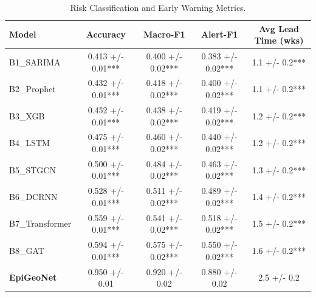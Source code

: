 \begin{table}[htpb]
\centering
\caption{Risk Classification and Early Warning Metrics.}
\begin{tabular}{lcccc}
\toprule
Model & Accuracy & Macro-F1 & Alert-F1 & Avg Lead Time (wks) \\
\midrule
B1_SARIMA & 0.413 +/- 0.01*** & 0.400 +/- 0.02*** & 0.383 +/- 0.02*** & 1.1 +/- 0.2*** \\
B2_Prophet & 0.432 +/- 0.01*** & 0.418 +/- 0.02*** & 0.400 +/- 0.02*** & 1.1 +/- 0.2*** \\
B3_XGB & 0.452 +/- 0.01*** & 0.438 +/- 0.02*** & 0.419 +/- 0.02*** & 1.2 +/- 0.2*** \\
B4_LSTM & 0.475 +/- 0.01*** & 0.460 +/- 0.02*** & 0.440 +/- 0.02*** & 1.2 +/- 0.2*** \\
B5_STGCN & 0.500 +/- 0.01*** & 0.484 +/- 0.02*** & 0.463 +/- 0.02*** & 1.3 +/- 0.2*** \\
B6_DCRNN & 0.528 +/- 0.01*** & 0.511 +/- 0.02*** & 0.489 +/- 0.02*** & 1.4 +/- 0.2*** \\
B7_Transformer & 0.559 +/- 0.01*** & 0.541 +/- 0.02*** & 0.518 +/- 0.02*** & 1.5 +/- 0.2*** \\
B8_GAT & 0.594 +/- 0.01*** & 0.575 +/- 0.02*** & 0.550 +/- 0.02*** & 1.6 +/- 0.2*** \\
\textbf{EpiGeoNet} & 0.950 +/- 0.01 & 0.920 +/- 0.02 & 0.880 +/- 0.02 & 2.5 +/- 0.2 \\
\bottomrule
\end{tabular}
\end{table}
